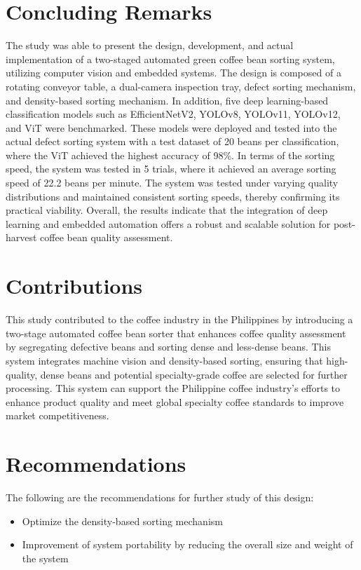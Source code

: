 \section{Concluding Remarks}

The study was able to present the design, development, and actual implementation of a two-staged automated green coffee bean sorting system, utilizing computer vision and embedded systems. The design is composed of a rotating conveyor table, a dual-camera inspection tray, defect sorting mechanism, and density-based sorting mechanism. In addition, five deep learning-based classification models such as EfficientNetV2, YOLOv8, YOLOv11, YOLOv12, and ViT were benchmarked. These models were deployed and tested into the actual defect sorting system with a test dataset of 20 beans per classification, where the ViT achieved the highest accuracy of 98\%. In terms of the sorting speed, the system was tested in 5 trials, where it achieved an average sorting speed of 22.2 beans per minute. The system was tested under varying quality distributions and maintained consistent sorting speeds, thereby confirming its practical viability. Overall, the results indicate that the integration of deep learning and embedded automation offers a robust and scalable solution for post-harvest coffee bean quality assessment.

\section{Contributions}
This study contributed to the coffee industry in the Philippines by introducing a two-stage automated coffee bean sorter that enhances coffee quality assessment by segregating defective beans and sorting dense and less-dense beans. This system integrates machine vision and density-based sorting, ensuring that high-quality, dense beans and potential specialty-grade coffee are selected for further processing. This system can support the Philippine coffee industry’s efforts to enhance product quality and meet global specialty coffee standards to improve market competitiveness. 


\section{Recommendations}
The following are the recommendations for further study of this design:
\begin{itemize}
    \item Optimize the density-based sorting mechanism
    \item Improvement of system portability by reducing the overall size and weight of the system
\end{itemize}

